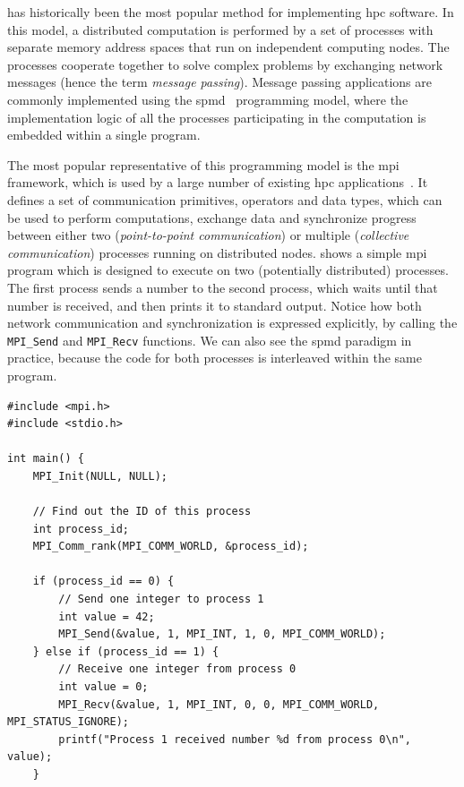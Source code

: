 \begin{description}[wide=0pt]
	\item[Message passing] has historically been the most popular method for implementing \gls{hpc} software. In
		this model, a distributed computation is performed by a set of processes with separate memory
		address spaces that run on independent computing nodes. The processes cooperate together to solve
		complex problems by exchanging network messages (hence the term \emph{message passing}). Message
		passing applications are commonly implemented using the
		\gls{spmd}~\cite{spmd} programming model, where the implementation logic of
		all the processes participating in the computation is embedded within a single program.

		The most popular representative of this programming model is the
		\gls{mpi}~\cite{mpi} framework, which is used by a large number of
		existing \gls{hpc} applications~\cite{mpiusagestudy2}. It defines a set of
		communication primitives, operators and data types, which can be used to perform computations,
		exchange data and synchronize progress between either two (\emph{point-to-point communication}) or multiple
		(\emph{collective communication}) processes running on distributed nodes.  shows a
		simple \gls{mpi} program which is designed to execute on two (potentially distributed)
		processes. The first process sends a number to the second process, which waits until that number is
		received, and then prints it to standard output. Notice how both network communication and
		synchronization is expressed explicitly, by calling the \texttt{MPI\_Send} and
		\texttt{MPI\_Recv} functions. We can also see the \gls{spmd} paradigm in practice,
		because the code for both processes is interleaved within the same program.

		\begin{listing}[h]
			\begin{verbatim}
#include <mpi.h>
#include <stdio.h>

int main() {
	MPI_Init(NULL, NULL);

	// Find out the ID of this process
	int process_id;
	MPI_Comm_rank(MPI_COMM_WORLD, &process_id);

	if (process_id == 0) {
		// Send one integer to process 1
		int value = 42;
		MPI_Send(&value, 1, MPI_INT, 1, 0, MPI_COMM_WORLD);
	} else if (process_id == 1) {
		// Receive one integer from process 0
		int value = 0;
		MPI_Recv(&value, 1, MPI_INT, 0, 0, MPI_COMM_WORLD, MPI_STATUS_IGNORE);
		printf("Process 1 received number %d from process 0\n", value);
	}


\end{verbatim}
\end{listing}
\end{description}
